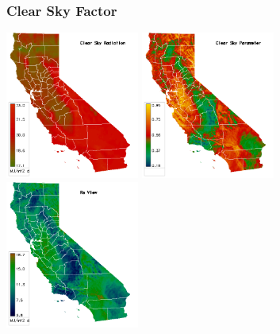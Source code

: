 \documentclass{beamer}
\begin{document}
\begin{frame}
  \frametitle{Clear Sky Factor}

  \includegraphics[width=0.33\textwidth]{2006-03-06/Rso.png}
  \includegraphics[width=0.33\textwidth]{2006-03-06/K.png}
  \includegraphics[width=0.33\textwidth]{2006-03-06/Rs.png}

\end{frame}
\end{document}
